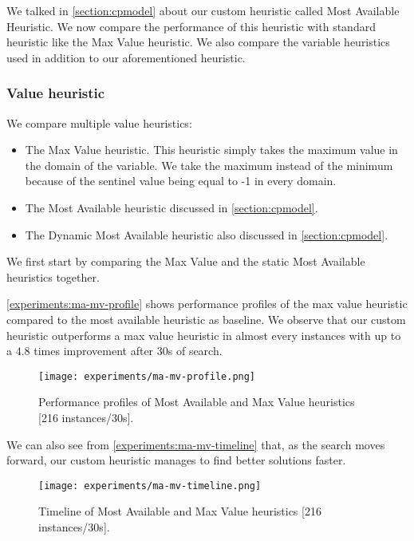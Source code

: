 \documentclass[../../thesis.tex]{subfiles}
\begin{document}
We talked in \autoref{section:cpmodel} about our custom heuristic called Most Available Heuristic.
We now compare the performance of this heuristic with standard heuristic like the Max Value heuristic.
We also compare the variable heuristics used in addition to our aforementioned heuristic.

\subsubsection{Value heuristic}

We compare multiple value heuristics:

\begin{itemize}
  \item The Max Value heuristic. This heuristic simply takes the maximum value in the domain of the variable. We 
  take the maximum instead of the minimum because of the sentinel value being equal to -1 in every domain. 
  \item The Most Available heuristic discussed in \autoref{section:cpmodel}.
  \item The Dynamic Most Available heuristic also discussed in \autoref{section:cpmodel}.
\end{itemize}

We first start by comparing the Max Value and the static Most Available heuristics together.

\autoref{experiments:ma-mv-profile} shows performance profiles of the max value heuristic compared to the most available heuristic 
as baseline. We observe that our custom heuristic outperforms a max value heuristic in almost every instances with 
up to a $4.8$ times improvement after 30s of search.

\begin{figure}
  \centering
  \texttt{[image: experiments/ma-mv-profile.png]}
  \caption{Performance profiles of Most Available and Max Value heuristics [216 instances/30s].}
  \label{experiments:ma-mv-profile}
\end{figure}

We can also see from \autoref{experiments:ma-mv-timeline} that, as the search moves forward, our custom heuristic manages to 
find better solutions faster.

\begin{figure}
  \centering
  \texttt{[image: experiments/ma-mv-timeline.png]}
  \caption{Timeline of Most Available and Max Value heuristics [216 instances/30s].}
  \label{experiments:ma-mv-timeline}
\end{figure}
\end{document}
